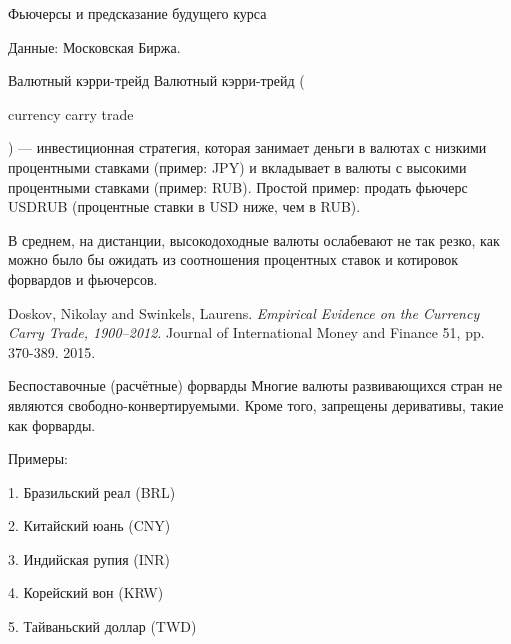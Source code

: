 \documentclass{beamer}
\newcommand{\en}[1]{\begin{otherlanguage}{english}#1\end{otherlanguage}}
\begin{document}
\begin{frame}{Фьючерсы и предсказание будущего курса}
\center
{}

\scriptsize Данные: Московская Биржа.
\end{frame}



\begin{frame}{Валютный кэрри-трейд}
\justify
\alert{Валютный кэрри-трейд} (\en{currency carry trade}) --- инвестиционная стратегия, которая занимает деньги в валютах с низкими процентными ставками (пример: JPY) и вкладывает в валюты с высокими процентными ставками (пример: RUB). Простой пример: продать фьючерс USDRUB (процентные ставки в USD ниже, чем в RUB).

\justify
В среднем, на дистанции, высокодоходные валюты ослабевают не так резко, как можно было бы ожидать из соотношения процентных ставок и котировок форвардов и фьючерсов.

\justify
\en{Doskov, Nikolay and Swinkels, Laurens. \textit{Empirical Evidence on the Currency Carry Trade, 1900--2012}. Journal of International Money and Finance 51, pp. 370-389. 2015.}

\end{frame}



\begin{frame}{Беспоставочные (расчётные) форварды}
\justify
Многие валюты развивающихся стран не являются свободно-конвертируемыми. Кроме того, запрещены деривативы, такие как форварды.

\justify
Примеры:

1. Бразильский реал (BRL)

2. Китайский юань (CNY)

3. Индийская рупия (INR)

4. Корейский вон (KRW)

5. Тайваньский доллар (TWD)
\end{frame}
\end{document}
